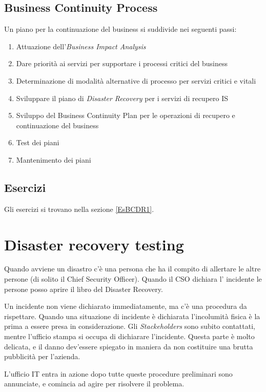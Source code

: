 \subsection{Business Continuity Process}

Un piano per la continuazione del business si suddivide nei seguenti passi:
\begin{enumerate}
  \item Attuazione dell'\textit{Business Impact Analysis}
  \item Dare priorità ai servizi per supportare i processi critici del business
  \item Determinazione di modalità alternative di processo per servizi critici 
  e vitali
  \item Sviluppare il piano di \textit{Disaster Recovery} per i servizi di 
  recupero IS
  \item Sviluppo del Business Continuity Plan per le operazioni di recupero e
  continuazione del business
  \item Test dei piani
  \item Mantenimento dei piani
\end{enumerate}

\subsection{Esercizi}

Gli esercizi si trovano nella sezione \ref{EsBCDR1}.

\section{Disaster recovery testing}

Quando avviene un disastro c'è una persona che ha il compito di allertare le
altre persone (di solito il Chief Security Officer). Quando il CSO dichiara l'
incidente le persone posso aprire il libro del Disaster Recovery.

Un incidente non viene dichiarato immediatamente, ma c'è una procedura da 
rispettare. Quando una situazione di incidente è dichiarata l'incolumità fisica 
è la prima a essere presa in considerazione. Gli \textit{Stackeholders} sono 
subito contattati, mentre l'ufficio stampa si occupa di dichiarare l'incidente. 
Questa parte è molto delicata, e il danno dev'essere spiegato in maniera da non 
costituire una brutta pubblicità per l'azienda.

L'ufficio IT entra in azione dopo tutte queste procedure preliminari sono 
annunciate, e comincia ad agire per risolvere il problema.

